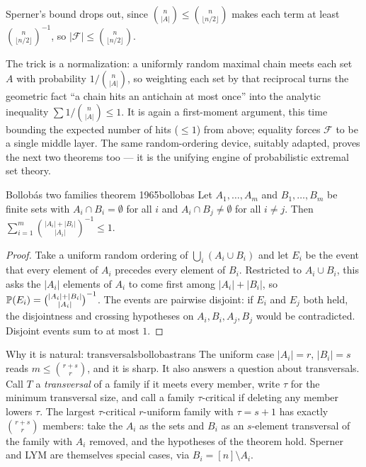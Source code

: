 Sperner's bound drops out, since $\binom{n}{|A|}\le\binom{n}{\lfloor n/2\rfloor}$
makes each term at least $\binom{n}{\lfloor n/2\rfloor}^{-1}$, so
$|\mathcal F|\le\binom{n}{\lfloor n/2\rfloor}$.

\begin{insight}
The trick is a normalization: a uniformly random maximal chain meets each set
$A$ with probability $1/\binom{n}{|A|}$, so weighting each set by that
reciprocal turns the geometric fact ``a chain hits an antichain at most once''
into the analytic inequality $\sum 1/\binom{n}{|A|}\le1$. It is again a
first-moment argument, this time bounding the expected number of hits ($\le1$)
from above; equality forces $\mathcal F$ to be a single middle layer. The same
random-ordering device, suitably adapted, proves the next two theorems too ---
it is the unifying engine of probabilistic extremal set theory.
\end{insight}

\begin{theorem}{Bollob\'as two families theorem 1965}{bollobas}
Let $A_1,\dots,A_m$ and $B_1,\dots,B_m$ be finite sets with $A_i\cap B_i=\emptyset$
for all $i$ and $A_i\cap B_j\ne\emptyset$ for all $i\ne j$. Then
$\displaystyle\sum_{i=1}^m\binom{|A_i|+|B_i|}{|A_i|}^{-1}\le 1.$
\end{theorem}

\begin{proof}
Take a uniform random ordering of $\bigcup_i(A_i\cup B_i)$ and let $E_i$ be the
event that every element of $A_i$ precedes every element of $B_i$. Restricted
to $A_i\cup B_i$, this asks the $|A_i|$ elements of $A_i$ to come first among
$|A_i|+|B_i|$, so $\mathbb{P}(E_i)=\binom{|A_i|+|B_i|}{|A_i|}^{-1}$. The events are
pairwise disjoint: if $E_i$ and $E_j$ both held, the disjointness and crossing
hypotheses on $A_i,B_i,A_j,B_j$ would be contradicted. Disjoint events sum to
at most $1$.
\end{proof}

\begin{remark}{Why it is natural: transversals}{bollobastrans}
The uniform case $|A_i|=r,\,|B_i|=s$ reads $m\le\binom{r+s}{r}$, and it is
sharp. It also answers a question about transversals. Call $T$ a
\emph{transversal} of a family if it meets every member, write $\tau$ for the
minimum transversal size, and call a family $\tau$-critical if deleting any
member lowers $\tau$. The largest $\tau$-critical $r$-uniform family with
$\tau=s+1$ has exactly $\binom{r+s}{r}$ members: take the $A_i$ as the sets and
$B_i$ as an $s$-element transversal of the family with $A_i$ removed, and the
hypotheses of the theorem hold. Sperner and LYM are themselves special cases,
via $B_i=[n]\setminus A_i$.
\end{remark}

